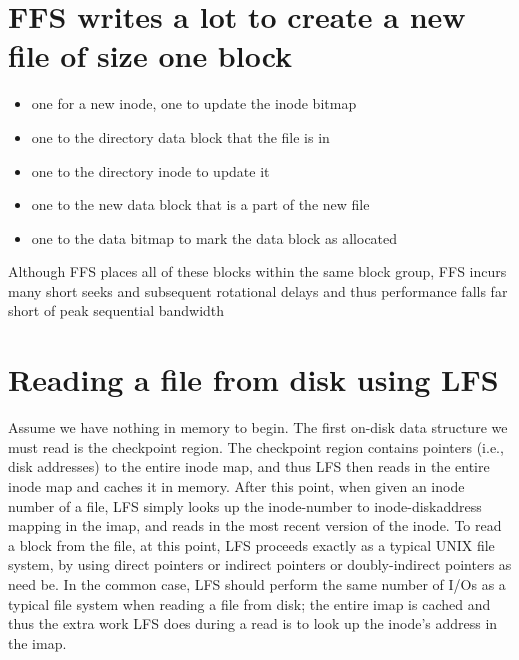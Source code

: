 \section*{FFS writes a lot to create a new file of size one block}
\begin{itemize}
\item one for a new inode, one to update the inode bitmap
\item one to the directory data block that the file is in
\item one to the directory inode to update it
\item one to the new data block that is a part of the new file
\item one to the data bitmap to mark the data block as allocated
\end{itemize}
Although FFS places all of these blocks within the same block group, FFS incurs many short seeks and subsequent rotational delays and thus performance falls far short of peak sequential bandwidth
\section*{Reading a file from disk using LFS}
Assume we have nothing in memory to begin. The first on-disk data structure we must read is the checkpoint region. The checkpoint region contains pointers (i.e., disk addresses) to the entire inode map, and thus LFS then reads in the entire inode map and caches it in memory. After this point, when given an inode number of a file, LFS simply looks up the inode-number to inode-diskaddress mapping in the imap, and reads in the most recent version of the inode. To read a block from the file, at this point, LFS proceeds exactly as a typical UNIX file system, by using direct pointers or indirect pointers or doubly-indirect pointers as need be. In the common case, LFS should perform the same number of I/Os as a typical file system when reading a file from disk; the entire imap is cached and thus the extra work LFS does during a read is to look up the inode’s address in the imap.
